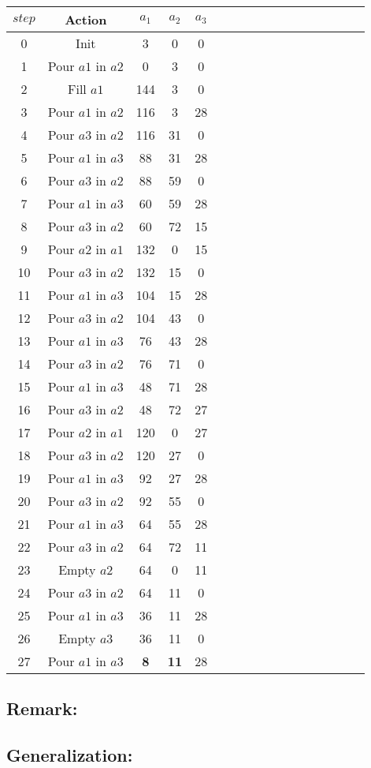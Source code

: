   \begin{center}
\begin{tabular}{|c|c|c|c|c|c|c|c|c|c|c|c|c|c|c|c|c|}
  \hline
  $step$ & Action & $a_1$ & $a_2$ & $a_3$  \\
  \hline
  0  & Init  & 3 & 0 & 0 \\
  1  & Pour $a1$ in $a2$  & 0 & 3 & 0 \\
  2  & Fill $a1$          & 144 & 3 & 0 \\
  3  & Pour $a1$ in $a2$  & 116 & 3 & 28 \\
  4  & Pour $a3$ in $a2$  & 116 & 31 & 0 \\
  5  & Pour $a1$ in $a3$  & 88 &  31 & 28 \\
  6  & Pour $a3$ in $a2$  & 88 &  59 & 0 \\
  7  & Pour $a1$ in $a3$  & 60 &  59 & 28 \\
  8  & Pour $a3$ in $a2$  & 60 &  72 & 15 \\
  9  & Pour $a2$ in $a1$  & 132 &  0 & 15 \\
  10 & Pour $a3$ in $a2$  & 132 & 15 & 0 \\
  11 & Pour $a1$ in $a3$  & 104 & 15 & 28 \\
  12 & Pour $a3$ in $a2$  & 104 & 43 & 0 \\
  13 & Pour $a1$ in $a3$  &  76 & 43 & 28 \\
  14 & Pour $a3$ in $a2$  &  76 & 71 & 0 \\
  15 & Pour $a1$ in $a3$  &  48 & 71 & 28 \\
  16 & Pour $a3$ in $a2$  &  48 & 72 & 27 \\ 
  17 & Pour $a2$ in $a1$  &  120 & 0 & 27 \\ 
  18 & Pour $a3$ in $a2$  &  120 & 27 & 0 \\
  19 & Pour $a1$ in $a3$  &  92 & 27 & 28 \\
  20 & Pour $a3$ in $a2$  &  92 & 55 & 0 \\
  21 & Pour $a1$ in $a3$  &  64 & 55 & 28 \\
  22 & Pour $a3$ in $a2$  &  64 & 72 & 11 \\
  23 & Empty $a2$         &  64 & 0  & 11 \\ 
  24 & Pour $a3$ in $a2$  &  64 & 11 & 0 \\
  25 & Pour $a1$ in $a3$  &  36 & 11 & 28 \\
  26 & Empty $a3$         &  36 & 11 & 0 \\
  27 & Pour $a1$ in $a3$  &   \textbf{8} & \textbf{11} & 28 \\  
  \hline
\end{tabular}
\end{center}

\subsection*{Remark:}


\subsection*{Generalization:}
